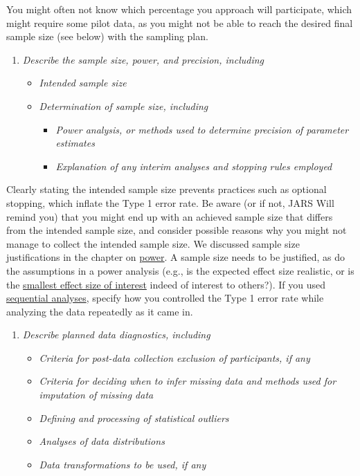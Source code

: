 \documentclass[
  oneside]{book}
\providecommand{\tightlist}{%
  \setlength{\itemsep}{0pt}\setlength{\parskip}{0pt}}
\begin{document}
You might often not know which percentage you approach will participate, which might require some pilot data, as you might not be able to reach the desired final sample size (see below) with the sampling plan.

\begin{enumerate}
\def\labelenumi{\arabic{enumi}.}
\setcounter{enumi}{3}
\tightlist
\item
  \emph{Describe the sample size, power, and precision, including}

  \begin{itemize}
  \tightlist
  \item
    \emph{Intended sample size}
  \item
    \emph{Determination of sample size, including}

    \begin{itemize}
    \tightlist
    \item
      \emph{Power analysis, or methods used to determine precision of parameter estimates}
    \item
      \emph{Explanation of any interim analyses and stopping rules employed}
    \end{itemize}
  \end{itemize}
\end{enumerate}

Clearly stating the intended sample size prevents practices such as optional stopping, which inflate the Type 1 error rate. Be aware (or if not, JARS Will remind you) that you might end up with an achieved sample size that differs from the intended sample size, and consider possible reasons why you might not manage to collect the intended sample size. We discussed sample size justifications in the chapter on \protect\hyperlink{power}{power}. A sample size needs to be justified, as do the assumptions in a power analysis (e.g., is the expected effect size realistic, or is the \protect\hyperlink{sesoi}{smallest effect size of interest} indeed of interest to others?). If you used \protect\hyperlink{sequential}{sequential analyses}, specify how you controlled the Type 1 error rate while analyzing the data repeatedly as it came in.

\begin{enumerate}
\def\labelenumi{\arabic{enumi}.}
\setcounter{enumi}{4}
\tightlist
\item
  \emph{Describe planned data diagnostics, including}

  \begin{itemize}
  \tightlist
  \item
    \emph{Criteria for post-data collection exclusion of participants, if any}
  \item
    \emph{Criteria for deciding when to infer missing data and methods used for imputation of missing data}
  \item
    \emph{Defining and processing of statistical outliers}
  \item
    \emph{Analyses of data distributions}
  \item
    \emph{Data transformations to be used, if any}
  \end{itemize}
\end{enumerate}
\end{document}
